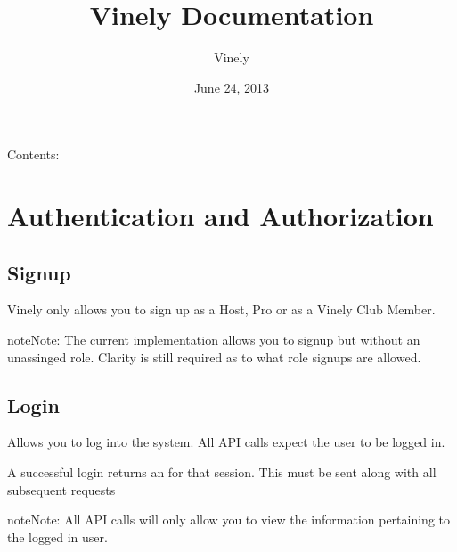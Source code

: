 \documentclass[letterpaper,10pt,english]{sphinxmanual}
\title{Vinely Documentation}
\date{June 24, 2013}
\author{Vinely}
\begin{document}
\maketitle
\tableofcontents
{}\label{index::doc}


Contents:


\chapter{Authentication and Authorization}
\label{auth:authentication-and-authorization}\label{auth:welcome-to-vinely-s-documentation}\label{auth::doc}\label{auth:ref-auth}

\section{Signup}
\label{auth:signup}
Vinely only allows you to sign up as a Host, Pro or as a Vinely Club Member.


\begin{fulllineitems}
\label{auth:post--api-v1-auth-signup-}
\end{fulllineitems}


\begin{notice}{note}{Note:}
The current implementation allows you to signup but without an unassinged role.
Clarity is still required as to what role signups are allowed.
\end{notice}


\section{Login}
\label{auth:login}
Allows you to log into the system. All API calls expect the user to be logged in.


\begin{fulllineitems}
\label{auth:post--api-v1-auth-login-}
\end{fulllineitems}


A successful login returns an  for that session. This  must be sent along with
all subsequent requests

\begin{notice}{note}{Note:}
All API calls will only allow you to view the information pertaining to the logged in user.
\end{notice}
\end{document}
